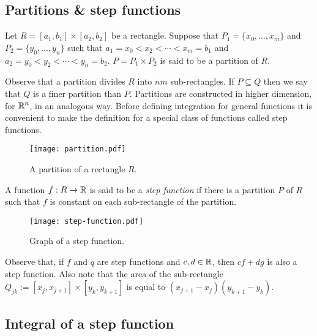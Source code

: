 \subsection*{Partitions \& step functions}
%
\begin{definition*}[partition]
    Let \(R = [a_1,b_1] \times [a_2,b_2]\) be a rectangle.
    Suppose that \(P_1 = \{x_0,\ldots,x_m\}\) and \(P_2 = \{y_0,\ldots,y_n\}\) such that
    \(a_1 = x_0 < x_2 < \cdots < x_m = b_1\) and \(a_2 = y_0 < y_2 < \cdots < y_n = b_2\).
    \(P= P_1 \times P_2\) is said to be a partition of \(R\).
\end{definition*}
%
Observe that a partition divides \(R\) into \(nm\) sub-rectangles.
If \(P \subseteq Q\) then we say that \(Q\) is a finer partition than \(P\).
Partitions are constructed in higher dimension, for \(\mathbb{R}^n\), in an analogous way.
Before defining integration for general functions it is convenient to make the definition for a special class of functions called step functions.
%
\begin{figure}
    \centering
    \texttt{[image: partition.pdf]}
    \caption{A partition of a rectangle \(R\).}
\end{figure}
%
\begin{definition}
    A function \(f:R\to \mathbb{R} \) is said to be a \emph{step function} if there is a partition \(P\) of \(R\) such that \(f\) is constant on each sub-rectangle of the partition.
\end{definition}
%
\begin{figure}
    \centering
    \texttt{[image: step-function.pdf]}
    \caption{Graph of a step function.}
\end{figure}
%
Observe that, if \(f\) and \(q\) are step functions and  \(c,d \in \mathbb{R}\), then \(c f + d g\) is also a step function.
Also note that the area of the sub-rectangle \(Q_{jk}:=[x_{j},x_{j+1}]\times [y_{k},y_{k+1}]\) is equal to \( (x_{j+1}-x_{j})(y_{k+1}-y_{k})\).

\subsection*{Integral of a step function}

